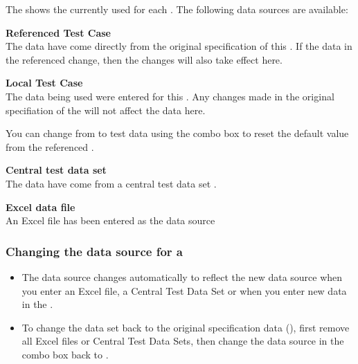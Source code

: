 The \gdpropview{} shows the currently used  for each \gdcase{}. The following data sources are available:


\textbf{Referenced Test Case}\\
The data have come directly from the original specification of this \gdcase{}. If the data in the referenced \gdcase{} change, then the changes will also take effect here.

\textbf{Local Test Case}\\
The data being used were entered for this \gdcase{}. Any changes made in the original specifiation of the \gdcase{} will not affect the data here. 

You can change from  to  test data using the combo box to reset the default value from the referenced \gdcase{}.


\textbf{Central test data set}\\
The data have come from a central test data set .

\textbf{Excel data file}\\
An Excel file has been entered as the data source 

\subsubsection{Changing the data source for a \gdcase{}}
\begin{itemize}
\item The data source changes automatically to reflect the new data source when you enter an Excel file, a Central Test Data Set or when you enter new data in the \gdcase{}. 
\item To change the data set back to the original specification data (), first remove all Excel files or Central Test Data Sets, then change the data source in the combo box back to .
\end{itemize}
